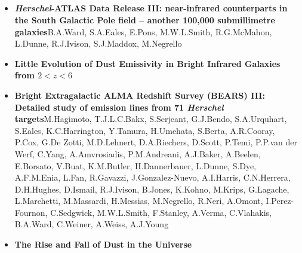\subsection*{}

\begin{itemize}
  \item[]{\citealt{Ward_2022}\newline\textbf{\textit{Herschel}-ATLAS Data Release III: near-infrared counterparts in the South Galactic Pole field -- another 100,000 submillimetre galaxies}\newline B.A.Ward, S.A.Eales, E.Pons, M.W.L.Smith, R.G.McMahon, L.Dunne, R.J.Ivison, S.J.Maddox, M.Negrello}
  
  \item[]{\citealt{Ward_2024}}\newline\textbf{Little Evolution of Dust Emissivity in Bright Infrared Galaxies from $2 < z < 6$}
\end{itemize} 


\begin{itemize}

  \item[]{\citealt{Hagimoto_2023}\newline\textbf{Bright Extragalactic ALMA Redshift Survey (BEARS) III: Detailed study of emission lines from 71 \textit{Herschel} targets}\newline M.Hagimoto, T.J.L.C.Bakx, S.Serjeant, G.J.Bendo, S.A.Urquhart, S.Eales, K.C.Harrington, Y.Tamura, H.Umehata, S.Berta, A.R.Cooray, P.Cox, G.De Zotti, M.D.Lehnert, D.A.Riechers, D.Scott, P.Temi, P.P.van der Werf, C.Yang, A.Amvrosiadis, P.M.Andreani, A.J.Baker, A.Beelen, E.Borsato, V.Buat, K.M.Butler, H.Dannerbauer, L.Dunne, S.Dye, A.F.M.Enia, L.Fan, R.Gavazzi, J.Gonzalez-Nuevo, A.I.Harris, C.N.Herrera, D.H.Hughes, D.Ismail, R.J.Ivison, B.Jones, K.Kohno, M.Krips, G.Lagache, L.Marchetti, M.Massardi, H.Messias, M.Negrello, R.Neri, A.Omont, I.Perez-Fournon, C.Sedgwick, M.W.L.Smith, F.Stanley, A.Verma, C.Vlahakis, B.A.Ward, C.Weiner, A.Weiss, A.J.Young}
  
  \item[]{\citealt{Eales_2024}}\newline\textbf{The Rise and Fall of Dust in the Universe}
 
\end{itemize}  